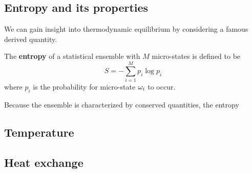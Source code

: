 \newpage %
\subsection{Entropy and its properties}
We can gain insight into thermodynamic equilibrium by considering a famous derived quantity.
\begin{shaded}
  The \textbf{entropy} of a statistical ensemble \Om with $M$ micro-states is defined to be
  \begin{equation}
    \label{eq:entropy}
    S = - \sum_{i = 1}^M p_i \log p_i
  \end{equation}
  where $p_i$ is the probability for micro-state $\omega_i$ to occur.
\end{shaded}

Because the ensemble \Om is characterized by conserved quantities, the entropy 




\newpage %
\subsection{Temperature}



\newpage %
\subsection{Heat exchange}
